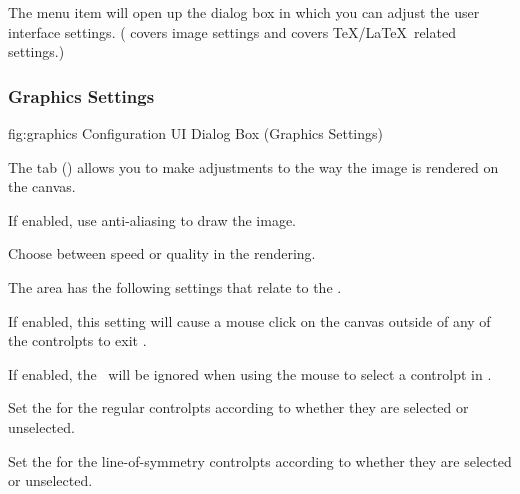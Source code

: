 
The menu item  will open up 
the  dialog box
in which you can adjust the user interface settings.
( covers image settings
and  covers \TeX\slash\LaTeX\ related
settings.)


\subsubsection{Graphics Settings}\label{sec:graphics}


\FloatFig
  {fig:graphics}
  {}
  {Configuration UI Dialog Box (Graphics Settings)}

The  tab ()
allows you to make adjustments to the way the image is rendered on
the \gls{canvas}.


If enabled, use \gls{anti-aliasing} to draw the image.


Choose between speed or quality in the \gls{rendering}.


The  area has the following settings that
relate to the \editpathmode.


If enabled, this setting will cause a mouse \gls{click} on the
\gls{canvas} outside of any of the \glspl{controlpt} to exit
\editpathmode.


If enabled, the \gridlock\ will be ignored when using the
mouse to select a \gls{controlpt} in \editpathmode.


Set the  for the regular
\glspl*{controlpt} according to whether they are selected or
unselected.


Set the  for the \gls{line-of-symmetry}
\glspl*{controlpt} according to whether they are selected or
unselected.



